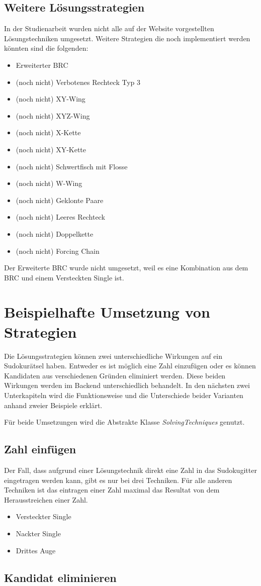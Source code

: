 \subsection{Weitere Lösungsstrategien}
In der Studienarbeit wurden nicht alle auf der Website \cite{martin} vorgestellten Lösungstechniken umgesetzt. Weitere Strategien die noch implementiert werden könnten sind die folgenden:
\begin{itemize}
	\item Erweiterter \ac{BRC}
	\item (noch nicht) Verbotenes Rechteck Typ 3
	\item (noch nicht) XY-Wing
	\item (noch nicht) XYZ-Wing
	\item (noch nicht) X-Kette
	\item (noch nicht) XY-Kette
	\item (noch nicht) Schwertfisch mit Flosse
	\item (noch nicht) W-Wing
	\item (noch nicht) Geklonte Paare
	\item (noch nicht) Leeres Rechteck
	\item (noch nicht) Doppelkette
	\item (noch nicht) Forcing Chain
\end{itemize}
Der Erweiterte \ac{BRC} wurde nicht umgesetzt, weil es eine Kombination aus dem \ac{BRC} und einem Versteckten Single ist. 

\section{Beispielhafte Umsetzung von Strategien}
Die Lösungsstrategien können zwei unterschiedliche Wirkungen auf ein Sudokurätsel haben. Entweder es ist möglich eine Zahl einzufügen oder es können Kandidaten aus verschiedenen Gründen eliminiert werden. Diese beiden Wirkungen werden im Backend unterschiedlich behandelt. In den nächsten zwei Unterkapiteln wird die Funktionsweise und die Unterschiede beider Varianten anhand zweier Beispiele erklärt. 

Für beide Umsetzungen wird die Abstrakte Klasse \textit{SolvingTechniques} genutzt.

\subsection{Zahl einfügen}

Der Fall, dass aufgrund einer Lösungstechnik direkt eine Zahl in das Sudokugitter eingetragen werden kann, gibt es nur bei drei Techniken. Für alle anderen Techniken ist das eintragen einer Zahl maximal das Resultat von dem Herausstreichen einer Zahl. 
\begin{itemize}
	\item Versteckter Single
	\item Nackter Single
	\item Drittes Auge
\end{itemize}

\subsection{Kandidat eliminieren}
